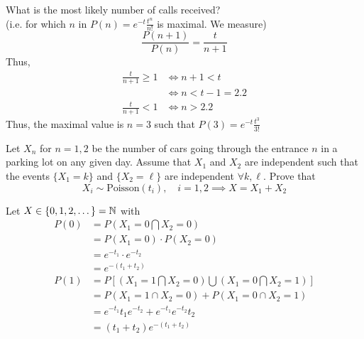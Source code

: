 \documentclass{article}
\begin{document}
		\begin{exmp}
			What is the most likely number of calls received?\\
			(i.e. for which $n$ in $P(n) = e^{-t} \frac{t^n}{n!}$ is maximal. We measure)
			$$ \frac{P(n+1)}{P(n)} = \frac{t}{n+1}$$
			Thus, 
			\begin{align*}
				\frac{t}{n+1} \geq 1 &\iff n+1 < t \\
				&\iff n < t-1 = 2.2 \\
				\frac{t}{n+1} < 1 &\iff n > 2.2 
			\end{align*}
			Thus, the maximal value is $n=3$ such that $P(3)=e^{-t} \frac{t^3}{3!}$
			\begin{figure}[h]
			\end{figure}
		\end{exmp}
		\begin{exe}
			Let $X_n$  for $n=1,2$ be the number of cars going through the entrance $n$ in a parking lot on any given day. Assume that $X_1$ and $X_2$ are independent such that the events $\{X_1 = k\}$ and $\{X_2 = \ell\}$ are independent $\forall k, \ell$. Prove that
			$$ X_i \sim \text{Poisson}(t_i), \quad i =1,2 \implies X = X_1 + X_2$$
		\end{exe}
		\begin{sol}
			Let $X \in \{ 0, 1, 2,\dots\} = \mathbb{N}$ with
			\begin{align*}
				P(0) &= P\left( X_1 =0 \bigcap X_2 = 0 \right) \\
				&= P(X_1 = 0) \cdot P (X_2 =0) \\
				&= e^{-t_1} \cdot e^{-t_2} \\
				&= e^{-(t_1 + t_2)} \\
				P(1) &= P \left[ \left( X_1 = 1 \bigcap X_2 = 0 \right) \bigcup \left( X_1 = 0 \bigcap X_2 = 1 \right) \right] \\
				&= P\left( X_1 = 1 \cap X_2 = 0 \right) + P(X_1 = 0 \cap X_2 = 1) \\
				&= e^{-t_1} t_1 e^{-t_2} + e^{-t_1}e^{-t_2} t_2 \\
				&= (t_1 + t_2 )e^{- (t_1 + t_2)}
			\end{align*}
		\end{sol}
\end{document}
